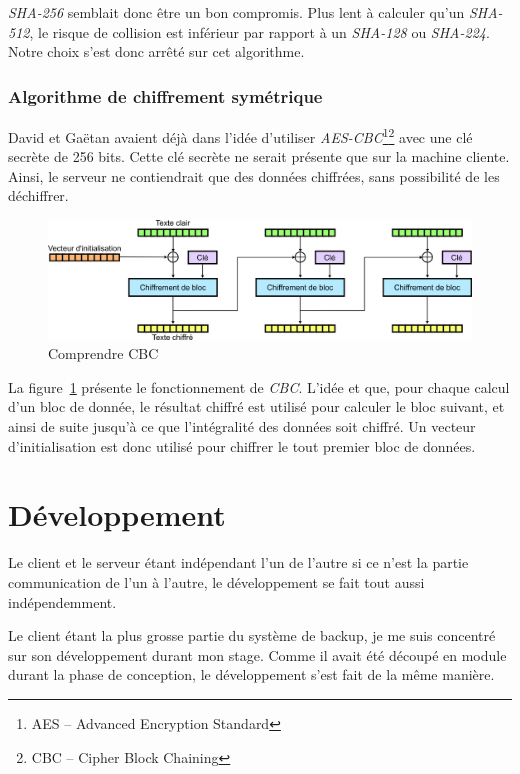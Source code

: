 \documentclass[a4paper,10pt, twoside]{report}
\begin{document}
\begin{spacing}{1.2}
\textit{SHA-256}\cite{refSHA256} semblait donc être un bon compromis. Plus
lent à calculer qu'un \textit{SHA-512}, le risque de collision est
inférieur par rapport à un \textit{SHA-128} ou \textit{SHA-224}. Notre
choix s'est donc arrêté sur cet algorithme.

\subsubsection{Algorithme de chiffrement symétrique}
David et Gaëtan avaient déjà dans l'idée d'utiliser
\textit{AES-CBC}\footnote{AES -- Advanced Encryption Standard}\footnote{CBC --
Cipher Block Chaining}\cite{refAES}\cite{refCBC} avec une clé secrète de
256 bits. Cette clé secrète ne serait présente que sur la machine cliente.
Ainsi, le serveur ne contiendrait que des données chiffrées, sans
possibilité de les déchiffrer.

\begin{figure}[h!]
  \centering
  \includegraphics[width=15cm]{softwareDesign/schemaCBC.png}
  \caption{\label{schemaCBC} Comprendre CBC}
\end{figure}

La figure~\ref{schemaCBC} présente le fonctionnement de \textit{CBC}. L'idée
et que, pour chaque calcul d'un bloc de donnée, le résultat chiffré est
utilisé pour calculer le bloc suivant, et ainsi de suite jusqu'à ce que
l'intégralité des données soit chiffré. Un vecteur d'initialisation
est donc utilisé pour chiffrer le tout premier bloc de données.


\section{Développement}
Le client et le serveur étant indépendant l'un de l'autre si ce n'est la
partie communication de l'un à l'autre, le développement se fait tout
aussi indépendemment.

Le client étant la plus grosse partie du système de backup, je me suis
concentré sur son développement durant mon stage. Comme il avait été
découpé en module durant la phase de conception, le développement s'est
fait de la même manière.


\end{spacing}
\end{document}
